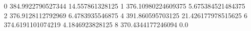 0 384.9922790527344 14.557861328125
1 376.10980224609375 5.675384521484375
2 376.9128112792969 6.4783935546875
4 391.860595703125 21.426177978515625
6 374.6191101074219 4.1846923828125
8 370.4344177246094 0.0
